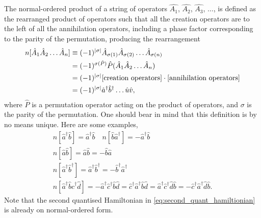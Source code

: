         The normal-ordered product of a string of operators $\hat{A_1}$, $\hat{A_2}$,
        $\hat{A_3}$, $\dots$, is defined as the rearranged product of operators such 
        that all the creation operators are to the left of all the annihilation
        operators, including a phase factor corresponding to the parity of the
        permutation, producing the rearrangement
        \begin{equation} 
            \begin{aligned}
            n[\hat{A}_1\hat{A}_2 \dots \hat{A}_n ]
            &\equiv (-1)^{\abs{\sigma}}
                \hat{A}_{\sigma(1)}\hat{A}_{\sigma(2)} \dots \hat{A}_{\sigma(n)} \\
            &= (-1)^{\sigma(\hat{P})}\hat{P}(\hat{A}_1\hat{A}_2 \dots \hat{A}_n) \\
            &= (-1)^{\abs{\sigma}}
            [\text{creation operators}] \cdot [\text{annihilation operators}] \\
            &= (-1)^{\abs{\sigma}}\hat{a}^\dagger \hat{b}^\dagger \dots \hat{u} \hat{v},
            \end{aligned}
        \end{equation}
        where $\hat{P}$ is a permutation operator acting on the product of operators, 
        and $\sigma$ is the parity of the permutation. One should bear in mind that this 
        definition is by no means unique. Here are some examples,
        \begin{gather*}
            n[\hat{a}^\dagger \hat{b}] = \hat{a}^\dagger \hat{b} \quad
            n[\hat{b} \hat{a}^\dagger] = -\hat{a}^\dagger \hat{b} \\
            n[\hat{a} \hat{b} ] = \hat{a} \hat{b} = - \hat{b} \hat{a} \\
            n[\hat{a}^\dagger\hat{b}^\dagger ]
                = \hat{a}^\dagger \hat{b}^\dagger 
                = -\hat{b}^\dagger \hat{a}^\dagger \\
            n[\hat{a}^\dagger \hat{b} \hat{c}^\dagger \hat{d}]
                = -\hat{a}^\dagger \hat{c}^\dagger\hat{b} \hat{d} 
                = \hat{c}^\dagger \hat{a}^\dagger\hat{b} \hat{d} 
                = \hat{a}^\dagger \hat{c}^\dagger\hat{d} \hat{b} 
                = -\hat{c}^\dagger \hat{a}^\dagger\hat{d} \hat{b}.
        \end{gather*}
        Note that the second quantised Hamiltonian in \autoref{eq:second_quant_hamiltionian}
        is already on normal-ordered form.

